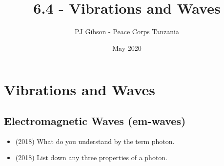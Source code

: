 \documentclass{article}
\title{6.4 - Vibrations and Waves}
\author{PJ Gibson - Peace Corps Tanzania}
\date{May 2020}
\begin{document}
\maketitle


\section{Vibrations and Waves}

\subsection{Electromagnetic Waves (em-waves)}
\begin{itemize}
\item (2018)  What do you understand by the term photon. 
\item (2018)  List down any three properties of a photon. 
\end{itemize}
\end{document}
